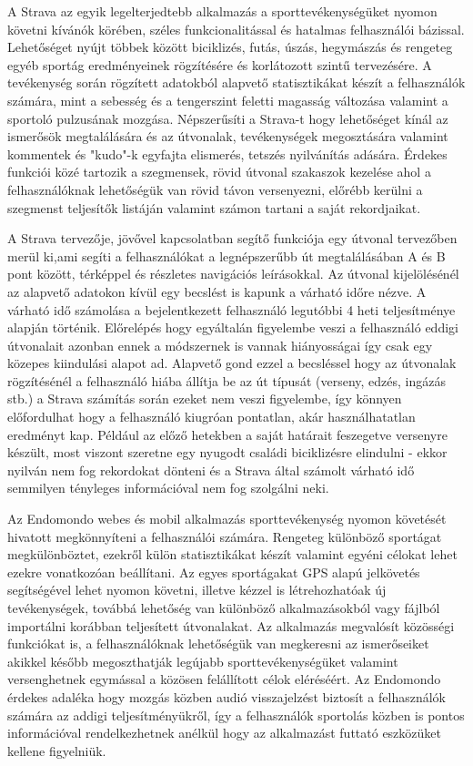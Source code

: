 A Strava \cite{strava} az egyik legelterjedtebb alkalmazás a sporttevékenységüket nyomon követni kívánók körében, széles funkcionalitással és hatalmas felhasználói bázissal. Lehetőséget nyújt többek között biciklizés, futás, úszás, hegymászás és rengeteg egyéb sportág eredményeinek rögzítésére és korlátozott szintű tervezésére. A tevékenység során rögzített adatokból alapvető statisztikákat készít a felhasználók számára, mint a sebesség és a tengerszint feletti magasság változása valamint a sportoló pulzusának mozgása. Népszerűsíti a Strava-t hogy lehetőséget kínál az ismerősök megtalálására és az útvonalak, tevékenységek megosztására valamint kommentek és "kudo"-k egyfajta elismerés, tetszés nyilvánítás adására. Érdekes funkciói közé tartozik a szegmensek, rövid útvonal szakaszok kezelése ahol a felhasználóknak lehetőségük van rövid távon versenyezni, előrébb kerülni a szegmenst teljesítők listáján valamint számon tartani a saját rekordjaikat. 

A Strava tervezője, jövővel kapcsolatban segítő funkciója egy útvonal tervezőben merül ki,ami segíti a felhasználókat a legnépszerűbb út megtalálásában A és B pont között, térképpel és részletes navigációs leírásokkal. Az útvonal kijelölésénél az alapvető adatokon kívül egy becslést is kapunk a várható időre nézve. A várható idő számolása a bejelentkezett felhasználó legutóbbi 4 heti teljesítménye alapján történik. Előrelépés hogy egyáltalán figyelembe veszi a felhasználó eddigi útvonalait azonban ennek a módszernek is vannak hiányosságai így csak egy közepes kiindulási alapot ad. Alapvető gond ezzel a becsléssel hogy az útvonalak rögzítésénél a felhasználó hiába állítja be az út típusát (verseny, edzés, ingázás stb.) a Strava számítás során ezeket nem veszi figyelembe, így könnyen előfordulhat hogy a felhasználó kiugróan pontatlan, akár használhatatlan eredményt kap. Például az előző hetekben a saját határait feszegetve versenyre készült, most viszont szeretne egy nyugodt családi biciklizésre elindulni - ekkor nyilván nem fog rekordokat dönteni és a Strava által számolt várható idő semmilyen tényleges információval nem fog szolgálni neki.


Az Endomondo \cite{endomondo} webes és mobil alkalmazás sporttevékenység nyomon követését hivatott megkönnyíteni a felhasználói számára. Rengeteg különböző sportágat megkülönböztet, ezekről külön statisztikákat készít valamint egyéni célokat lehet ezekre vonatkozóan beállítani. Az egyes sportágakat GPS alapú jelkövetés segítségével lehet nyomon követni, illetve kézzel is létrehozhatóak új tevékenységek, továbbá lehetőség van különböző alkalmazásokból vagy fájlból importálni korábban teljesített útvonalakat. Az alkalmazás megvalósít közösségi funkciókat is, a felhasználóknak lehetőségük van megkeresni az ismerőseiket akikkel később megoszthatják legújabb sporttevékenységüket valamint versenghetnek egymással a közösen felállított célok eléréséért. Az Endomondo érdekes adaléka hogy mozgás közben audió visszajelzést biztosít a felhasználók számára az addigi teljesítményükről, így a felhasználók sportolás közben is pontos információval rendelkezhetnek anélkül hogy az alkalmazást futtató eszközüket kellene figyelniük.



